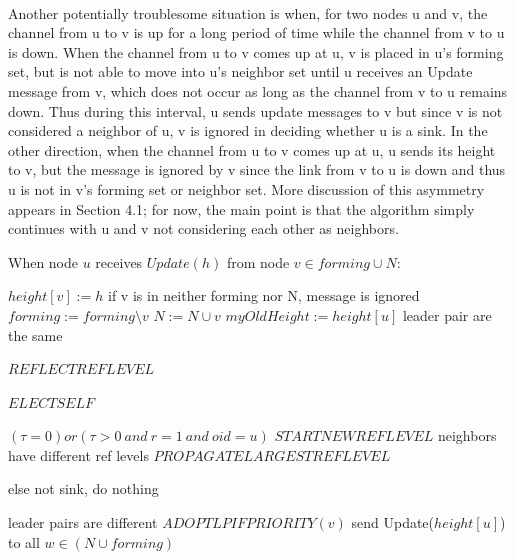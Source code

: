 \paragraph{}Another potentially troublesome situation is when, for two nodes u and v, the channel from u to v is up for a long period of time while the channel from v to u is down. When the channel from u to v comes up at u, v is placed in u’s forming set, but is not able to move into u’s neighbor set until u receives an Update message from v, which does not occur as long as the channel from v to u remains down. Thus during this interval, u sends update messages to v but since v is not considered a neighbor of u, v is ignored in deciding whether u is a sink. In the other direction, when the channel from u to v comes up at u, u sends its height to v, but the message is ignored by v since the link from v to u is down and thus u is not in v’s forming set or neighbor set. More discussion of this asymmetry appears in Section 4.1; for now, the main point is that the algorithm simply continues with u and v not considering each other as neighbors.

\begin{algorithm}
	\caption{When node $u$ receives $Update(h)$ from node $v \in forming \cup N$:}
\begin{algorithmic}[1]
	
	\State $height[v] := h$ \Comment if v is in neither forming nor N, message is ignored
	\State $forming := forming \setminus {v}$
	\State $N := N \cup {v}$
	\State $myOldHeight := height[u]$
	 \Comment leader pair are the same
	
	
		\State $REFLECTREFLEVEL$
	
		\State $ELECTSELF$
		
		\Else \Comment $(\tau = 0) or (\tau > 0~and~r = 1~and~oid = u)$
		\State $STARTNEWREFLEVEL$
		\EndIf
	\Else \Comment neighbors have different ref levels
	\State $PROPAGATELARGESTREFLEVEL$
	
	\EndIf 
	
	\EndIf \Comment else not sink, do nothing
	
	\Else \Comment leader pairs are different
	\State $ADOPTLPIFPRIORITY(v)$	
	\EndIf
	\State send Update($height[u]$) to all $w \in (N \cup forming)$
	\EndIf
	
\end{algorithmic}

\end{algorithm}

